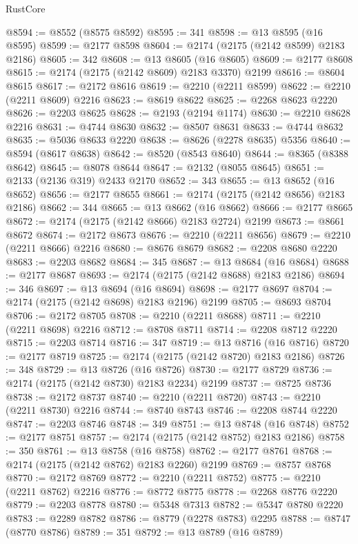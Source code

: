 \begin{lexlean}{RustCore}
\begin{coremodule}
@8594 := @8552 (@8575 @8592)
@8595 := 341
@8598 := @13 @8595 (@16 @8595)
@8599 := @2177 @8598
@8604 := @2174 (@2175 (@2142 @8599) @2183 @2186)
@8605 := 342
@8608 := @13 @8605 (@16 @8605)
@8609 := @2177 @8608
@8615 := @2174 (@2175 (@2142 @8609) @2183 @3370) @2199
@8616 := @8604 @8615
@8617 := @2172 @8616
@8619 := @2210 (@2211 @8599)
@8622 := @2210 (@2211 @8609) @2216
@8623 := @8619 @8622
@8625 := @2268 @8623 @2220
@8626 := @2203 @8625
@8628 := @2193 (@2194 @1174)
@8630 := @2210 @8628 @2216
@8631 := @4744 @8630
@8632 := @8507 @8631
@8633 := @4744 @8632
@8635 := @5036 @8633 @2220
@8638 := @8626 (@2278 @8635) @5356
@8640 := @8594 (@8617 @8638)
@8642 := @8520 (@8543 @8640)
@8644 := @8365 (@8388 @8642)
@8645 := @8078 @8644
@8647 := @2132 (@8055 @8645)
@8651 := @2133 (@2136 @319) @2433 @2170
@8652 := 343
@8655 := @13 @8652 (@16 @8652)
@8656 := @2177 @8655
@8661 := @2174 (@2175 (@2142 @8656) @2183 @2186)
@8662 := 344
@8665 := @13 @8662 (@16 @8662)
@8666 := @2177 @8665
@8672 := @2174 (@2175 (@2142 @8666) @2183 @2724) @2199
@8673 := @8661 @8672
@8674 := @2172 @8673
@8676 := @2210 (@2211 @8656)
@8679 := @2210 (@2211 @8666) @2216
@8680 := @8676 @8679
@8682 := @2208 @8680 @2220
@8683 := @2203 @8682
@8684 := 345
@8687 := @13 @8684 (@16 @8684)
@8688 := @2177 @8687
@8693 := @2174 (@2175 (@2142 @8688) @2183 @2186)
@8694 := 346
@8697 := @13 @8694 (@16 @8694)
@8698 := @2177 @8697
@8704 := @2174 (@2175 (@2142 @8698) @2183 @2196) @2199
@8705 := @8693 @8704
@8706 := @2172 @8705
@8708 := @2210 (@2211 @8688)
@8711 := @2210 (@2211 @8698) @2216
@8712 := @8708 @8711
@8714 := @2208 @8712 @2220
@8715 := @2203 @8714
@8716 := 347
@8719 := @13 @8716 (@16 @8716)
@8720 := @2177 @8719
@8725 := @2174 (@2175 (@2142 @8720) @2183 @2186)
@8726 := 348
@8729 := @13 @8726 (@16 @8726)
@8730 := @2177 @8729
@8736 := @2174 (@2175 (@2142 @8730) @2183 @2234) @2199
@8737 := @8725 @8736
@8738 := @2172 @8737
@8740 := @2210 (@2211 @8720)
@8743 := @2210 (@2211 @8730) @2216
@8744 := @8740 @8743
@8746 := @2208 @8744 @2220
@8747 := @2203 @8746
@8748 := 349
@8751 := @13 @8748 (@16 @8748)
@8752 := @2177 @8751
@8757 := @2174 (@2175 (@2142 @8752) @2183 @2186)
@8758 := 350
@8761 := @13 @8758 (@16 @8758)
@8762 := @2177 @8761
@8768 := @2174 (@2175 (@2142 @8762) @2183 @2260) @2199
@8769 := @8757 @8768
@8770 := @2172 @8769
@8772 := @2210 (@2211 @8752)
@8775 := @2210 (@2211 @8762) @2216
@8776 := @8772 @8775
@8778 := @2268 @8776 @2220
@8779 := @2203 @8778
@8780 := @5348 @7313
@8782 := @5347 @8780 @2220
@8783 := @2289 @8782
@8786 := @8779 (@2278 @8783) @2295
@8788 := @8747 (@8770 @8786)
@8789 := 351
@8792 := @13 @8789 (@16 @8789)

\end{coremodule}
\end{lexlean}
